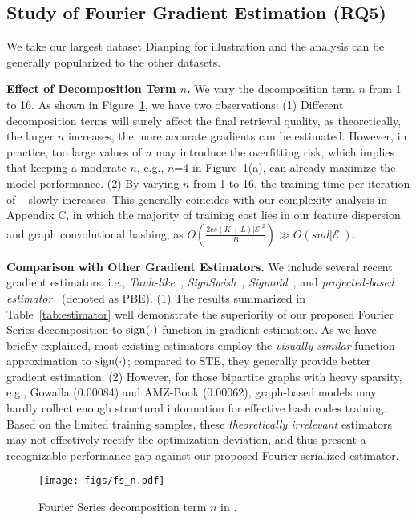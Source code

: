\subsection{\textbf{Study of Fourier Gradient Estimation (RQ5)}}
\label{sec:fs_exp}
We take our largest dataset Dianping for illustration and the analysis can be generally popularized to the other datasets. 

{\textbf{Effect of Decomposition Term $n$.}}
We vary the decomposition term $n$ from 1 to 16.
As shown in Figure~\ref{fig:fs_n}, we have two observations:
(1) Different decomposition terms will surely affect the final retrieval quality, as theoretically, the larger $n$ increases, the more accurate gradients can be estimated.
However, in practice, too large values of $n$ may introduce the overfitting risk, which implies that keeping a moderate $n$, e.g., $n$=4 in Figure~\ref{fig:fs_n}(a), can already maximize the model performance.
(2) By varying $n$ from 1 to 16, the training time per iteration of \model~ slowly increases. 
This generally coincides with our complexity analysis in Appendix C, in which the majority of training cost lies in our feature dispersion and graph convolutional hashing, as $O(\frac{2cs(K+L)|\mathcal{E}|^2}{B}) \gg O(snd|\mathcal{E}|)$.

{\textbf{Comparison with Other Gradient Estimators.}}
We include several recent gradient estimators, i.e., \textit{Tanh-like}~\cite{qin2020forward,gong2019differentiable}, \textit{SignSwish}~\cite{darabi2018bnn}, \textit{Sigmoid}~\cite{sigmoid}, and \textit{projected-based estimator}~\cite{RBCN} (denoted as PBE).
(1) The results summarized in Table~\ref{tab:estimator} well demonstrate the superiority of our proposed Fourier Series decomposition to $\operatorname{sign}(\cdot)$ function in gradient estimation.
As we have briefly explained, most existing estimators employ the \textit{visually similar} function approximation to $\operatorname{sign}(\cdot)$; compared to STE, they generally provide better gradient estimation.
(2) However, for those bipartite graphs with heavy sparsity, e.g., Gowalla (0.00084) and AMZ-Book (0.00062), graph-based models may hardly collect enough structural information for effective hash codes training.
Based on the limited training samples, these \textit{theoretically irrelevant} estimators may not effectively rectify the optimization deviation, and thus present a recognizable performance gap against our proposed Fourier serialized estimator.




\begin{figure}[t]
\begin{minipage}{0.5\textwidth}
\texttt{[image: figs/fs\_n.pdf]}
\end{minipage} 
\vspace{-0.1in}
\caption{Fourier Series decomposition term $n$ in \model.}
\label{fig:fs_n}
\end{figure}



